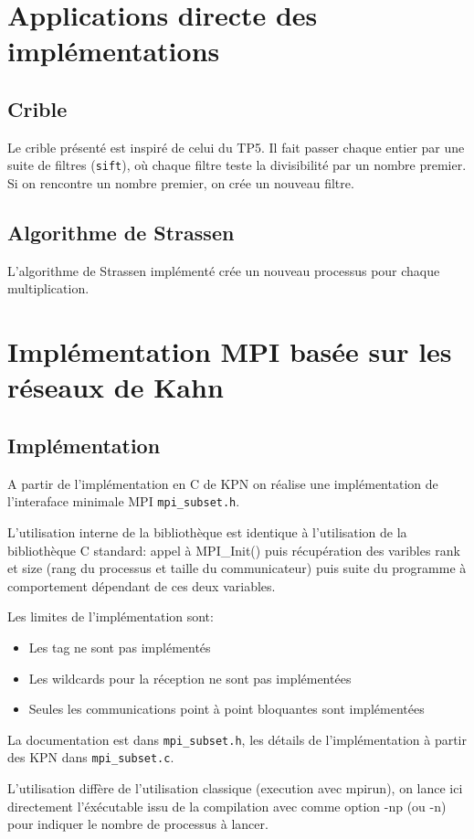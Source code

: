 \documentclass[a4paper]{article}
\begin{document}
\section{Applications directe des implémentations}
\subsection{Crible}
Le crible présenté est inspiré de celui du TP5. Il fait passer chaque entier par une suite de filtres (\texttt{sift}), où chaque filtre teste la divisibilité par un nombre premier. Si on rencontre un nombre premier, on crée un nouveau filtre.
\subsection{Algorithme de Strassen}
L'algorithme de Strassen implémenté crée un nouveau processus pour chaque multiplication.

\section{Implémentation MPI basée sur les réseaux de Kahn}

\subsection{Implémentation}

A partir de l'implémentation en C de KPN on réalise une implémentation de l'interaface minimale MPI \verb|mpi_subset.h|.

L'utilisation interne de la bibliothèque est identique à l'utilisation de la bibliothèque C standard: appel à MPI\_Init() puis récupération des varibles rank et size (rang du processus et taille du communicateur) puis suite du programme à comportement dépendant de ces deux variables.

Les limites de l'implémentation sont:
\begin{itemize}
    \item Les tag ne sont pas implémentés
    \item Les wildcards pour la réception ne sont pas implémentées
    \item Seules les communications point à point bloquantes sont implémentées
\end{itemize}

La documentation est dans \verb|mpi_subset.h|, les détails de l'implémentation à partir des KPN dans \verb|mpi_subset.c|.

L'utilisation diffère de l'utilisation classique (execution avec mpirun), on lance ici directement l'éxécutable issu de la compilation avec comme option -np (ou -n) pour indiquer le nombre de processus à lancer.
\end{document}
